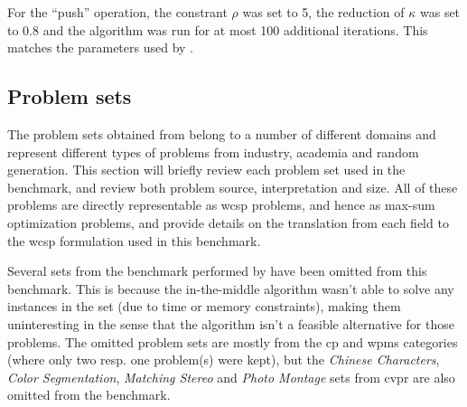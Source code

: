 For the \enquote{push} operation, the constrant \(\rho\) was set to \num{5}, the reduction of \(\kappa\) was set to \num{0.8} and the algorithm was run for at most \num{100} additional iterations.
This matches the parameters used by \textcite{Bastert10}.

\subsection{Problem sets}
The problem sets obtained from \textcite{deGivry14} belong to a number of different domains and represent different types of problems from industry, academia and random generation.
This section will briefly review each problem set used in the benchmark, and review both problem source, interpretation and size.
All of these problems are directly representable as \gls{wcsp} problems, and hence as max-sum optimization problems, and \textcite{deGivry14} provide details on the translation from each field to the \gls{wcsp} formulation used in this benchmark.

Several sets from the benchmark performed by \textcite{deGivry14} have been omitted from this benchmark.
This is because the in-the-middle algorithm wasn't able to solve any instances in the set (due to time or memory constraints), making them uninteresting in the sense that the algorithm isn't a feasible alternative for those problems. 
The omitted problem sets are mostly from the \gls{cp} and \gls{wpms} categories (where only two resp. one problem(s) were kept), but the \emph{Chinese Characters}, \emph{Color Segmentation}, \emph{Matching Stereo} and \emph{Photo Montage} sets from \gls{cvpr} are also omitted from the benchmark.


